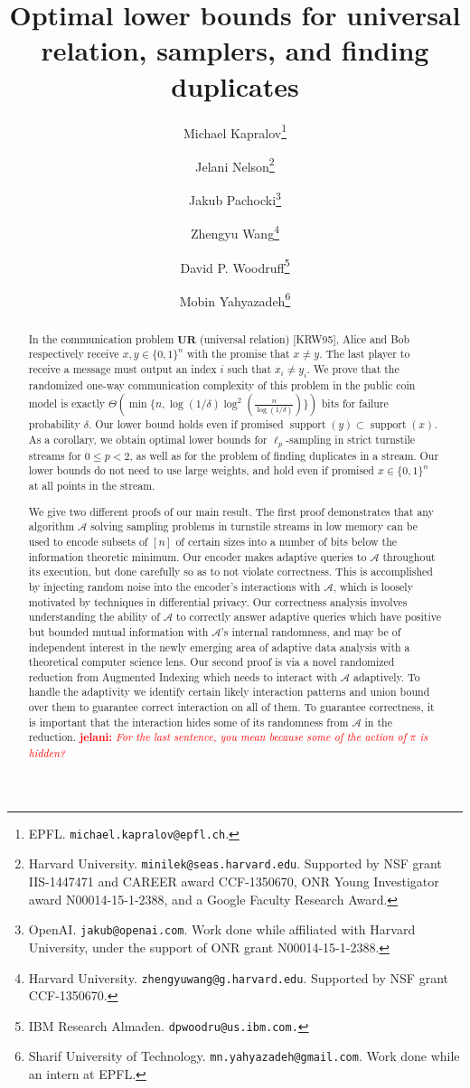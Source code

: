 \documentclass[11pt]{article}
\title{Optimal lower bounds for universal relation, samplers, and finding duplicates}
\author{
  Michael Kapralov\thanks{EPFL. \texttt{michael.kapralov@epfl.ch}.}
  \and Jelani Nelson\thanks{Harvard University. \texttt{minilek@seas.harvard.edu}. Supported by NSF grant IIS-1447471 and
   CAREER award CCF-1350670, ONR Young Investigator award N00014-15-1-2388, and a Google Faculty Research Award.}
  \and Jakub Pachocki\thanks{OpenAI. \texttt{jakub@openai.com}. Work done while affiliated with Harvard University, under the support of ONR grant N00014-15-1-2388.}
  \and Zhengyu Wang\thanks{Harvard University. \texttt{zhengyuwang@g.harvard.edu}. Supported by NSF grant CCF-1350670.}
  \and David P. Woodruff\thanks{IBM Research Almaden. \texttt{dpwoodru@us.ibm.com.}}
  \and Mobin Yahyazadeh\thanks{Sharif University of Technology. \texttt{mn.yahyazadeh@gmail.com}. Work done while an intern at EPFL.}}
\newcommand{\jelani}[1]{\textcolor{red}{\textbf{jelani:} \textit{#1}}}
\newcommand{\ur}{\mathbf{UR}\xspace}
\begin{document}
\setcounter{page}{0}

\maketitle

\thispagestyle{empty}

\begin{abstract}
In the communication problem $\ur$ (universal relation) [KRW95], Alice and Bob respectively receive $x, y \in\{0,1\}^n$ with the promise that $x\neq y$. The last player to receive a message must output an index $i$ such that $x_i\neq y_i$. We prove that the randomized one-way communication complexity of this problem in the public coin model is exactly $\Theta(\min\{n,\log(1/\delta)\log^2(\frac n{\log(1/\delta)})\})$ bits for failure probability $\delta$. Our lower bound holds even if promised $\mathop{support}(y)\subset \mathop{support}(x)$. As a corollary, we obtain optimal lower bounds for $\ell_p$-sampling in strict turnstile streams for $0\le p < 2$, as well as for the problem of finding duplicates in a stream. Our lower bounds do not need to use large weights, and hold even if promised $x\in\{0,1\}^n$ at all points in the stream. 

We give two different proofs of our main result. The first proof demonstrates that any algorithm $\mathcal A$ solving sampling problems in turnstile streams in low memory can be used to encode subsets of $[n]$ of certain sizes into a number of bits below the information theoretic minimum. Our encoder makes adaptive queries to $\mathcal A$ throughout its execution, but done carefully so as to not violate correctness. This is accomplished by injecting random noise into the encoder's interactions with $\mathcal A$, which is loosely motivated by techniques in differential privacy. Our correctness analysis involves understanding the ability of $\mathcal A$ to correctly answer adaptive queries which have positive but bounded mutual information with $\mathcal A$'s internal randomness, and may be of independent interest in the newly emerging area of adaptive data analysis with a theoretical computer science lens. Our second proof is via a novel randomized reduction from Augmented Indexing \cite{MiltersenNSW98} which needs to interact with $\mathcal A$ adaptively. To handle the adaptivity we identify certain likely interaction patterns and union bound over them to guarantee correct interaction on all of them. To guarantee correctness, it is important that the interaction hides some of its randomness from $\mathcal A$ in the reduction.  \jelani{For the last sentence, you mean because some of the action of $\pi$ is hidden?}


\end{abstract}
\end{document}
